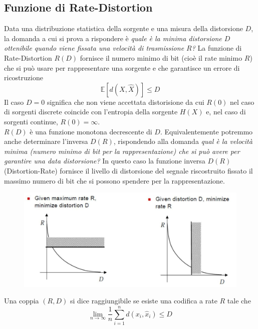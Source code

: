 \subsection{Funzione di Rate-Distortion}
Data una distribuzione statistica della sorgente e una misura della distorsione $D$, la domanda a cui si prova
a rispondere è \emph{quale è la minima distorsione $D$ ottenibile quando viene fissata una velocità di trasmissione $R$?} La funzione di Rate-Distortion $R(D)$ fornisce il numero minimo di bit (cio\`e il rate minimo $R$) che si può usare per rappresentare una sorgente e che garantisce un errore di ricostruzione
\begin{equation}
    \mathbb{E} [d(X, \hat{X})] \leq D
\end{equation}
Il caso $D = 0$ significa che non viene accettata distorisione da cui $R(0)$ nel caso di sorgenti discrete coincide con l'entropia della sorgente $H(X)$ e, nel caso di sorgenti continue, $R(0) = \infty$. \\
$R(D)$ è una funzione monotona decrescente di $D$. Equivalentemente potremmo anche determinare l'inversa $D(R)$, rispondendo alla domanda \emph{qual è la velocità minima (numero minimo di bit per
la rappresentazione) che si può avere per garantire una data distorsione?} In questo caso la funzione inversa
$D(R)$ (Distortion-Rate) fornisce il livello di distorsione del segnale riscostruito fissato il massimo numero di bit che si possono spendere per la rappresentazione.
\begin{figure}[H]
    \centering
    \includegraphics[scale=0.2]{img/rdf.jpg}
    \label{fig:rdf}
\end{figure}
 Una coppia $(R,D)$ si dice raggiungibile se esiste una codifica a rate $R$ tale che
\begin{equation}
    \lim_{n \to \infty} \frac{1}{n} \sum_{i=1}^n d(x_i, \hat{x}_i) \leq D
\end{equation}
